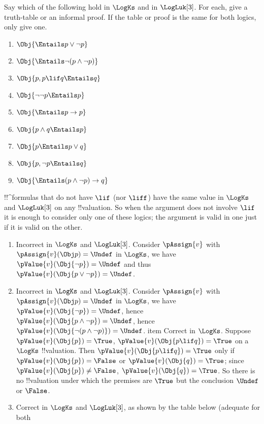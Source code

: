 \documentclass[../../../../include/open-logic-section]{subfiles}
\begin{document}
\begin{prob}[Validity]
Say which of the following hold in $\LogKs$ and in $\LogLuk[3]$. For each, give a truth-table or an informal proof. If the table or proof is the same for both logics, only give one. 
\begin{enumerate}
	\item $\Obj{\Entails p \lor\lnot p}$
	\item $\Obj{\Entails \lnot(p \land\lnot p)}$
    \item $\Obj{p, p \lif q \Entails q}$
    \item $\Obj{\lnot\lnot p \Entails p}$
    \item $\Obj{\Entails p \rightarrow p}$
    \item $\Obj{p \land q \Entails p}$
    \item $\Obj{p \Entails p \lor q}$
    \item $\Obj{p, \lnot p \Entails q}$
    \item $\Obj{\Entails (p \land \lnot p) \rightarrow q}$
\end{enumerate}
\begin{ans}
	!!^{formula}s that do not have $\lif$ (nor $\liff$) have the same value
	 in $\LogKs$ and $\LogLuk[3]$ on any !!{valuation}. So when the 
	 argument does not involve $\lif$ it is enough to consider
	only one of these logics; the argument is valid in one just if it 
	is valid on the other.
\begin{enumerate}
\item Incorrect in $\LogKs$ and $\LogLuk[3]$. Consider $\pAssign{v}$
	with $\pAssign{v}(\Obj p)=\Undef$ in $\LogKs$, we have
	$\pValue{v}(\Obj{\lnot p})=\Undef$ and thus $\pValue{v}(\Obj{p \lor 
	\lnot p})=\Undef$.
\item Incorrect in  $\LogKs$ and $\LogLuk[3]$. Consider $\pAssign{v}$
	with $\pAssign{v}(\Obj p)=\Undef$ in $\LogKs$, we have
	$\pValue{v}(\Obj{\lnot p})=\Undef$, hence $\pValue{v}(\Obj{p
	\land\lnot p})=\Undef$, hence $\pValue{v}(\Obj{\lnot(p \land\lnot
	p)})=\Undef$. item Correct in $\LogKs$. Suppose
	$\pValue{v}(\Obj{p})=\True$, $\pValue{v}(\Obj{p\lif q})=\True$ on a
	$\LogKs$ !!{valuation}. Then $\pValue{v}(\Obj{p\lif q})=\True$ only if
	$\pValue{v}(\Obj{p})=\False$ or $\pValue{v}(\Obj{q})=\True$; since
	$\pValue{v}(\Obj{p})\neq \False$, $\pValue{v}(\Obj{q})=\True$. So
	there is no !!{valuation} under which the premises are $\True$ but the
	conclusion $\Undef$ or $\False$. 
\item Correct in $\LogKs$ and
	$\LogLuk[3]$, as shown by the table below (adequate for both

\end{enumerate}
\end{ans}
\end{prob}
\end{document}
